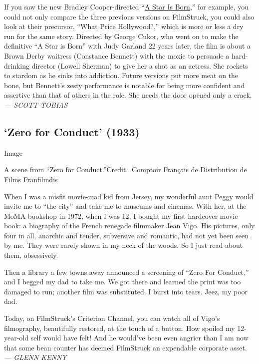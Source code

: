 If you saw the new Bradley Cooper-directed
``\href{https://www.nytimes3xbfgragh.onion/2018/10/03/movies/a-star-is-born-review-lady-gaga-bradley-cooper.html}{A
Star Is Born},'' for example, you could not only compare the three
previous versions on FilmStruck, you could also look at their precursor,
``What Price Hollywood?,'' which is more or less a dry run for the same
story. Directed by George Cukor, who went on to make the definitive ``A
Star is Born'' with Judy Garland 22 years later, the film is about a
Brown Derby waitress (Constance Bennett) with the moxie to persuade a
hard-drinking director (Lowell Sherman) to give her a shot as an
actress. She rockets to stardom as he sinks into addiction. Future
versions put more meat on the bone, but Bennett's zesty performance is
notable for being more confident and assertive than that of others in
the role. She needs the door opened only a crack. \emph{--- SCOTT
TOBIAS}

\hypertarget{zero-for-conduct-1933}{%
\subsection{`Zero for Conduct' (1933)}\label{zero-for-conduct-1933}}

Image

A scene from ``Zero for Conduct.''Credit...Comptoir Français de
Distribution de Films Franfilmdis

When I was a misfit movie-mad kid from Jersey, my wonderful aunt Peggy
would invite me to ``the city'' and take me to museums and cinemas. With
her, at the MoMA bookshop in 1972, when I was 12, I bought my first
hardcover movie book: a biography of the French renegade filmmaker Jean
Vigo. His pictures, only four in all, anarchic and tender, subversive
and romantic, had not yet been seen by me. They were rarely shown in my
neck of the woods. So I just read about them, obsessively.

Then a library a few towns away announced a screening of ``Zero For
Conduct,'' and I begged my dad to take me. We got there and learned the
print was too damaged to run; another film was substituted. I burst into
tears. Jeez, my poor dad.

Today, on FilmStruck's Criterion Channel, you can watch all of Vigo's
filmography, beautifully restored, at the touch of a button. How spoiled
my 12-year-old self would have felt! And he would've been even angrier
than I am now that some bean counter has deemed FilmStruck an expendable
corporate asset. \emph{--- GLENN KENNY}

